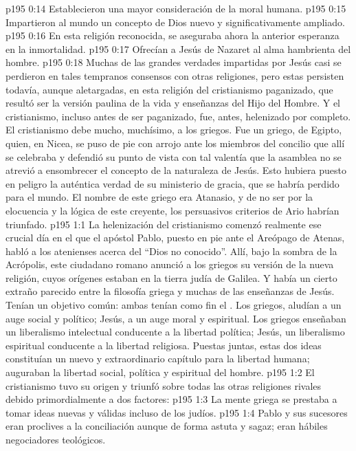 \vs p195 0:14 Establecieron una mayor consideración de la moral humana.
\vs p195 0:15 Impartieron al mundo un concepto de Dios nuevo y significativamente ampliado.
\vs p195 0:16 En esta religión reconocida, se aseguraba ahora la anterior esperanza en la inmortalidad.
\vs p195 0:17 Ofrecían a Jesús de Nazaret al alma hambrienta del hombre.
\vs p195 0:18 \pc Muchas de las grandes verdades impartidas por Jesús casi se perdieron en tales tempranos consensos con otras religiones, pero estas persisten todavía, aunque aletargadas, en esta religión del cristianismo paganizado, que resultó ser la versión paulina de la vida y enseñanzas del Hijo del Hombre. Y el cristianismo, incluso antes de ser paganizado, fue, antes, helenizado por completo. El cristianismo debe mucho, muchísimo, a los griegos. Fue un griego, de Egipto, quien, en Nicea, se puso de pie con arrojo ante los miembros del concilio que allí se celebraba y defendió su punto de vista con tal valentía que la asamblea no se atrevió a ensombrecer el concepto de la naturaleza de Jesús. Esto hubiera puesto en peligro la auténtica verdad de su ministerio de gracia, que se habría perdido para el mundo. El nombre de este griego era Atanasio, y de no ser por la elocuencia y la lógica de este creyente, los persuasivos criterios de Ario habrían triunfado.
\vs p195 1:1 La helenización del cristianismo comenzó realmente ese crucial día en el que el apóstol Pablo, puesto en pie ante el Areópago de Atenas, habló a los atenienses acerca del “Dios no conocido”. Allí, bajo la sombra de la Acrópolis, este ciudadano romano anunció a los griegos su versión de la nueva religión, cuyos orígenes estaban en la tierra judía de Galilea. Y había un cierto extraño parecido entre la filosofía griega y muchas de las enseñanzas de Jesús. Tenían un objetivo común: ambas tenían como fin el . Los griegos, aludían a un auge social y político; Jesús, a un auge moral y espiritual. Los griegos enseñaban un liberalismo intelectual conducente a la libertad política; Jesús, un liberalismo espiritual conducente a la libertad religiosa. Puestas juntas, estas dos ideas constituían un nuevo y extraordinario capítulo para la libertad humana; auguraban la libertad social, política y espiritual del hombre.
\vs p195 1:2 El cristianismo tuvo su origen y triunfó sobre todas las otras religiones rivales debido primordialmente a dos factores:
\vs p195 1:3 La mente griega se prestaba a tomar ideas nuevas y válidas incluso de los judíos.
\vs p195 1:4 Pablo y sus sucesores eran proclives a la conciliación aunque de forma astuta y sagaz; eran hábiles negociadores teológicos.
